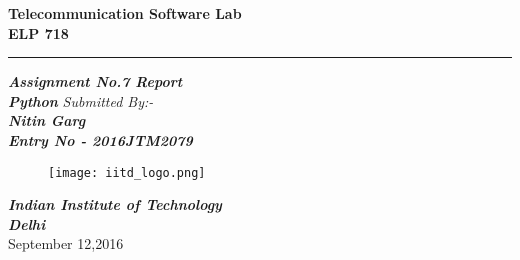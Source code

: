 \documentclass[10pt]{article}
\title{}
\author{}
\date{\today}
\begin{document}

\begin{titlepage}

\centering
\vfill

\textbf{\Huge{Telecommunication Software Lab   %
\linebreak   %
\\ELP 718}}\\
\rule{\textwidth}{3pt}  %
\vskip2cm
\textbf{\Large{\emph{Assignment No.7 Report}}}\\
\vskip 0.5cm
\textbf{\Large{\emph{Python}}}
\vskip1cm
\emph{Submitted By:-}
\vskip0.1cm
\Large{\textbf{\\\emph{Nitin Garg}}}
\vskip0.1cm
\Large{\textbf{\\\emph{Entry No - 2016JTM2079}}}
\vskip3cm
\begin{figure}[hbtp]

\begin{center}
\texttt{[image: iitd\_logo.png]}
\end{center}
\end{figure}

\vskip1cm
\textbf{\emph{Indian Institute of Technology}}\\
\textbf{\emph{Delhi}}\\
\vskip0.5cm     %
September 12,2016
\vfill  %
\end{titlepage}






\pagebreak



\newpage



\tableofcontents




\newpage
\end{document}
